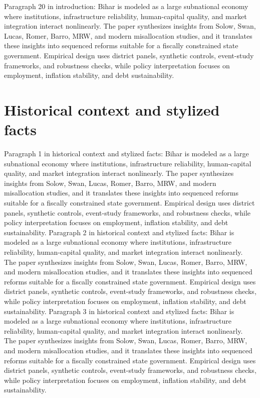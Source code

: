 \documentclass[preprint,12pt]{elsarticle}
\begin{document}
Paragraph 20 in introduction: Bihar is modeled as a large subnational economy where institutions, infrastructure reliability, human-capital quality, and market integration interact nonlinearly. The paper synthesizes insights from Solow, Swan, Lucas, Romer, Barro, MRW, and modern misallocation studies, and it translates these insights into sequenced reforms suitable for a fiscally constrained state government. Empirical design uses district panels, synthetic controls, event-study frameworks, and robustness checks, while policy interpretation focuses on employment, inflation stability, and debt sustainability.
\section{Historical context and stylized facts}
Paragraph 1 in historical context and stylized facts: Bihar is modeled as a large subnational economy where institutions, infrastructure reliability, human-capital quality, and market integration interact nonlinearly. The paper synthesizes insights from Solow, Swan, Lucas, Romer, Barro, MRW, and modern misallocation studies, and it translates these insights into sequenced reforms suitable for a fiscally constrained state government. Empirical design uses district panels, synthetic controls, event-study frameworks, and robustness checks, while policy interpretation focuses on employment, inflation stability, and debt sustainability.
Paragraph 2 in historical context and stylized facts: Bihar is modeled as a large subnational economy where institutions, infrastructure reliability, human-capital quality, and market integration interact nonlinearly. The paper synthesizes insights from Solow, Swan, Lucas, Romer, Barro, MRW, and modern misallocation studies, and it translates these insights into sequenced reforms suitable for a fiscally constrained state government. Empirical design uses district panels, synthetic controls, event-study frameworks, and robustness checks, while policy interpretation focuses on employment, inflation stability, and debt sustainability.
Paragraph 3 in historical context and stylized facts: Bihar is modeled as a large subnational economy where institutions, infrastructure reliability, human-capital quality, and market integration interact nonlinearly. The paper synthesizes insights from Solow, Swan, Lucas, Romer, Barro, MRW, and modern misallocation studies, and it translates these insights into sequenced reforms suitable for a fiscally constrained state government. Empirical design uses district panels, synthetic controls, event-study frameworks, and robustness checks, while policy interpretation focuses on employment, inflation stability, and debt sustainability.
\end{document}
